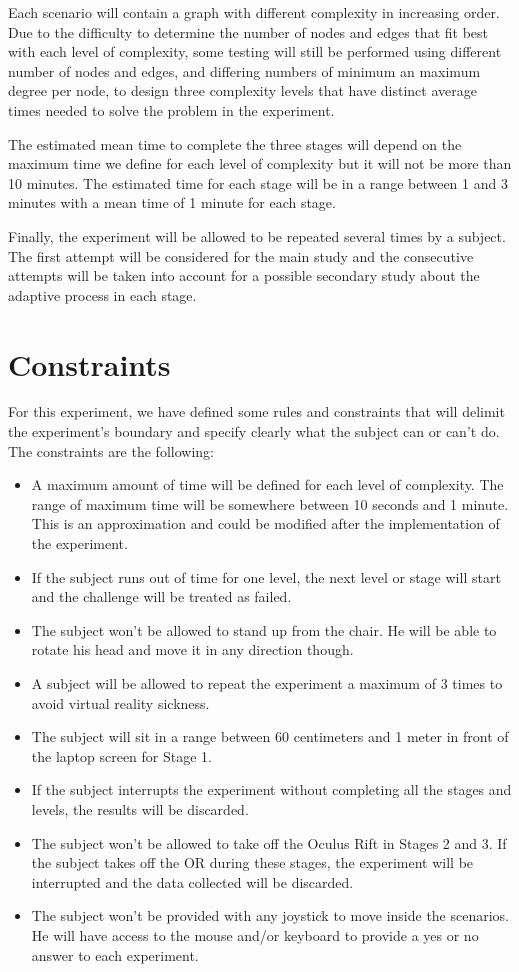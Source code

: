 Each scenario will contain a graph with
different complexity in increasing order. Due to the difficulty to
determine the number of nodes and edges that fit best with each level of
complexity, some testing will still be performed using different number
of nodes and edges, and differing numbers of minimum an maximum degree per node,
to design three complexity levels that have distinct
average times needed to solve the problem in the experiment.

The estimated mean time to complete the three stages will depend on the
maximum time we define for each level of complexity but it will not be
more than 10 minutes. The estimated time for each stage will be in a
range between 1 and 3 minutes with a mean time of 1 minute for each
stage.

Finally, the experiment will be allowed to be repeated several times by
a subject. The first attempt will be considered for the main study and
the consecutive attempts will be taken into account for a possible
secondary study about the adaptive process in each stage.

\section{Constraints}\label{constraints}

For this experiment, we have defined some rules and constraints that
will delimit the experiment's boundary and specify clearly what the
subject can or can't do. The constraints are the following:

\begin{itemize}
\item
  A maximum amount of time will be defined for each level of complexity.
  The range of maximum time will be somewhere between 10 seconds and 1
  minute. This is an approximation and could be modified after the
  implementation of the experiment.
\item
  If the subject runs out of time for one level, the next level or stage
  will start and the challenge will be treated as failed.
\item
  The subject won't be allowed to stand up from the chair. He will be
  able to rotate his head and move it in any direction though.
\item
  A subject will be allowed to repeat the experiment a maximum of 3
  times to avoid virtual reality sickness.
\item
  The subject will sit in a range between 60 centimeters and 1 meter in
  front of the laptop screen for Stage 1.
\item
  If the subject interrupts the experiment without completing all the
  stages and levels, the results will be discarded.
\item
  The subject won't be allowed to take off the Oculus Rift in Stages 2
  and 3. If the subject takes off the OR during these stages, the
  experiment will be interrupted and the data collected will be
  discarded.
\item
  The subject won't be provided with any joystick to move inside the
  scenarios. He will have access to the mouse and/or keyboard to provide
  a yes or no answer to each experiment.
\end{itemize}

